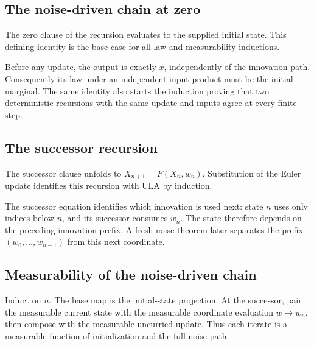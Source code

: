 \documentclass[11pt,a4paper]{report}
\begin{document}
\subsection{\texorpdfstring{The noise-driven chain at zero}{The noise-driven chain at zero}}
\label{report-step-UnadjustedLangevin-ChainLaw-lean-2}


The zero clause of the recursion evaluates to the supplied initial state. This defining identity is the base case for all law and measurability inductions.



Before any update, the output is exactly \(x\), independently of the innovation path. Consequently its law under an independent input product must be the initial marginal. The same identity also starts the induction proving that two deterministic recursions with the same update and inputs agree at every finite step.

\subsection{\texorpdfstring{The successor recursion}{The successor recursion}}
\label{report-step-UnadjustedLangevin-ChainLaw-lean-3}


The successor clause unfolds to \(X_{n+1}=F(X_n,w_n)\). Substitution of the Euler update identifies this recursion with ULA by induction.



The successor equation identifies which innovation is used next: state \(n\) uses only indices below \(n\), and its successor consumes \(w_n\). The state therefore depends on the preceding innovation prefix. A fresh-noise theorem later separates the prefix \((w_0,\ldots,w_{n-1})\) from this next coordinate.

\subsection{\texorpdfstring{Measurability of the noise-driven chain}{Measurability of the noise-driven chain}}
\label{report-step-UnadjustedLangevin-ChainLaw-lean-4}


Induct on \(n\). The base map is the initial-state projection. At the successor, pair the measurable current state with the measurable coordinate evaluation \(w\mapsto w_n\), then compose with the measurable uncurried update. Thus each iterate is a measurable function of initialization and the full noise path.
\end{document}
